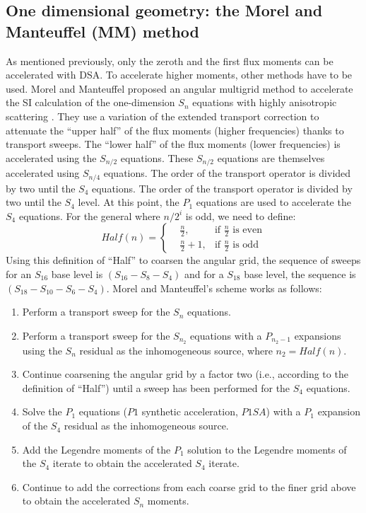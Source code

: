 \subsection{One dimensional geometry: the Morel and Manteuffel (MM) method}
As mentioned previously, only the zeroth and the first flux moments can be
accelerated with DSA. To accelerate higher moments, other methods have to be
used. Morel and Manteuffel proposed an angular multigrid method to accelerate
the SI calculation of the one-dimension $S_n$ equations with highly
anisotropic scattering \cite{multigrid_1d}. They use a variation of the
extended transport correction \cite{lathrop} to attenuate the ``upper half''
of the flux moments (higher frequencies) thanks to transport sweeps. The
``lower half'' of the flux moments (lower frequencies) is accelerated using
the $S_{n/2}$ equations. These $S_{n/2}$ equations are themselves accelerated
using $S_{n/4}$ equations. The order of the transport operator is divided by
two until the $S_4$ equations. The order of the transport operator is divided
by two until the $S_4$ level. At this point, the $P_1$ equations are used to
accelerate the $S_4$ equations. For the general where $n/2^i$ is odd, we need
to define:
\begin{equation}
Half(n) = \left\{
\begin{aligned}
&\frac{n}{2}, &\textrm{if }\frac{n}{2}\textrm{ is even}\\
&\frac{n}{2}+1, &\textrm{if }\frac{n}{2}\textrm{ is odd}
\end{aligned}
\right.
\end{equation}
Using this definition of ``Half'' to coarsen the angular grid, the sequence of
sweeps for an $S_{16}$ base level is $(S_{16}-S_8-S_4)$ and for a $S_{18}$
base level, the sequence is $(S_{18}-S_{10}-S_6-S_4)$. Morel and Manteuffel's
scheme works as follows:
\begin{enumerate}
\item Perform a transport sweep for the $S_n$ equations.
\item Perform a transport sweep for the $S_{n_2}$ equations with a $P_{n_2-1}$
expansions using the $S_n$ residual as the inhomogeneous source, where
$n_2=Half(n)$.
\item Continue coarsening the angular grid by a factor two (i.e., according to
the definition of ``Half'') until a sweep has been performed for the $S_4$
equations.
\item Solve the $P_1$ equations ($P1$ synthetic acceleration, $P1SA$) with a
$P_1$ expansion of the $S_4$ residual as the inhomogeneous source.
\item Add the Legendre moments of the $P_1$ solution to the Legendre moments
of the $S_4$ iterate to obtain the accelerated $S_4$ iterate.
\item Continue to add the corrections from each coarse grid to the finer grid
above to obtain the accelerated $S_n$ moments.
\end{enumerate}
